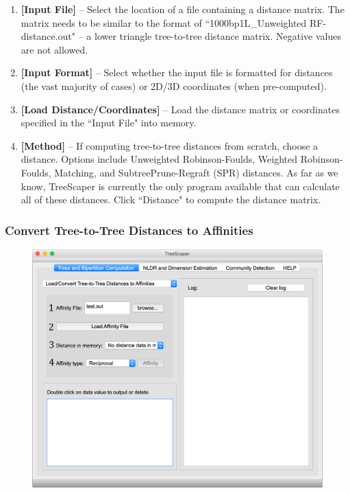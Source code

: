 \documentclass[11pt]{article}
\begin{document}
\begin{enumerate}[{\bf 1-}]
\item {\bf [Input File]} -- Select the location of a file containing a distance matrix. The matrix needs to
be similar to the format of ``1000bp1L\_Unweighted RF-distance.out" -- a lower triangle tree-to-tree distance matrix. Negative values are not allowed. \label{DistMenu1}

\item {\bf [Input Format]} -- Select whether the input file is formatted for distances (the vast majority
of cases) or 2D/3D coordinates (when pre-computed). \label{DistMenu2}

\item {\bf [Load Distance/Coordinates]} -- Load the distance matrix or coordinates specified in the
``Input File" into memory. \label{DistMenu3}

\item {\bf [Method]} -- If computing tree-to-tree distances from scratch, choose a distance. Options
include Unweighted Robinson-Foulds, Weighted Robinson-Foulds, Matching, and SubtreePrune-Regraft (SPR) distances. As far as we know, TreeScaper is currently the only program
available that can calculate all of these distances. Click ``Distance" to compute the distance
matrix. \label{DistMenu4}
\end{enumerate}

\newpage
\subsubsection{Convert Tree-to-Tree Distances to Affinities}\label{subsubsect:ConvertDistToAffinity}

\begin{figure}[thbp!]\centering
\includegraphics[scale=0.4]{imagesForManual/Figure11_6_1_6.png}
\end{figure}
\end{document}
